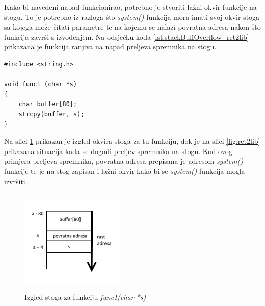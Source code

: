 \documentclass[times, utf8, diplomski, numeric]{fer}
\begin{document}
Kako bi navedeni napad funkcionirao, potrebno je stvoriti lažni okvir funkcije na stogu. To je potrebno iz razloga što \emph{system()} funkcija mora imati svoj okvir stoga sa kojega može čitati parametre te na kojemu se nalazi povratna adresa nakon što funkcija završi s izvođenjem. Na odsječku koda \ref{lst:stackBuffOverflow_ret2lib} prikazana je funkcija ranjiva na napad preljeva spremnika na stogu.

\begin{lstlisting}[frame=single, caption=Primjer preljeva spremnika na stogu, label={lst:stackBuffOverflow_ret2lib}]
#include <string.h>
 
void func1 (char *s)
{
	char buffer[80];
	strcpy(buffer, s);
}

\end{lstlisting}
Na slici \ref{fig:ret2lib_stackFrame} prikazan je izgled okvira stoga za tu funkciju, dok je na slici \ref{fig:ret2lib} prikazana situacija kada se dogodi preljev spremnika na stogu. Kod ovog primjera preljeva spremnika, povratna adresa prepisana je adresom \emph{system()} funkcije te je na stog zapisan i lažni okvir kako bi se \emph{system()} funkcija mogla izvršiti.  
\pagebreak

\begin{figure}[!htb]
\centering
\setlength\fboxsep{0pt}
\setlength\fboxrule{0.5pt}
\includegraphics[width=5cm, height=5cm]{slike/ret2lib_stackFrame}
\caption{Izgled stoga za funkciju \emph{func1(char *s)}}
\label{fig:ret2lib_stackFrame} 
\end{figure}
\end{document}
